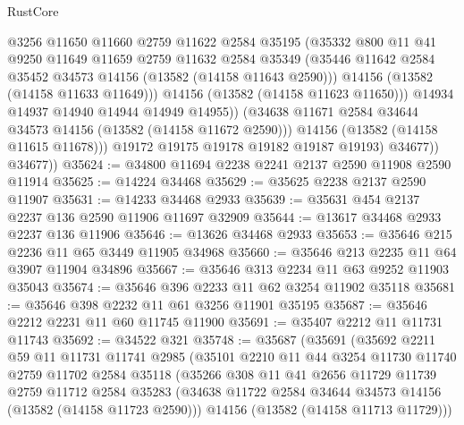 \begin{lexlean}{RustCore}
\begin{coremodule}
                      @3256
                      @11650
                      @11660
                      @2759
                      @11622
                      @2584
                      @35195
                      (@35332
                        @800
                        @11
                        @41
                        @9250
                        @11649
                        @11659
                        @2759
                        @11632
                        @2584
                        @35349
                        (@35446 @11642 @2584 @35452 @34573 @14156 (@13582 (@14158 @11643 @2590)))
                        @14156
                        (@13582 (@14158 @11633 @11649)))
                      @14156
                      (@13582 (@14158 @11623 @11650)))
                    @14934
                    @14937
                    @14940
                    @14944
                    @14949
                    @14955))
                (@34638 @11671 @2584 @34644 @34573 @14156 (@13582 (@14158 @11672 @2590)))
                @14156
                (@13582 (@14158 @11615 @11678)))
              @19172
              @19175
              @19178
              @19182
              @19187
              @19193)
            @34677))
        @34677))
@35624 := @34800 @11694 @2238 @2241 @2137 @2590 @11908 @2590 @11914
@35625 := @14224 @34468
@35629 := @35625 @2238 @2137 @2590 @11907
@35631 := @14233 @34468 @2933
@35639 := @35631 @454 @2137 @2237 @136 @2590 @11906 @11697 @32909
@35644 := @13617 @34468 @2933 @2237 @136 @11906
@35646 := @13626 @34468 @2933
@35653 := @35646 @215 @2236 @11 @65 @3449 @11905 @34968
@35660 := @35646 @213 @2235 @11 @64 @3907 @11904 @34896
@35667 := @35646 @313 @2234 @11 @63 @9252 @11903 @35043
@35674 := @35646 @396 @2233 @11 @62 @3254 @11902 @35118
@35681 := @35646 @398 @2232 @11 @61 @3256 @11901 @35195
@35687 := @35646 @2212 @2231 @11 @60 @11745 @11900
@35691 := @35407 @2212 @11 @11731 @11743
@35692 := @34522 @321
@35748 := @35687
    (@35691
      (@35692
        @2211
        @59
        @11
        @11731
        @11741
        @2985
        (@35101
          @2210
          @11
          @44
          @3254
          @11730
          @11740
          @2759
          @11702
          @2584
          @35118
          (@35266
            @308
            @11
            @41
            @2656
            @11729
            @11739
            @2759
            @11712
            @2584
            @35283
            (@34638 @11722 @2584 @34644 @34573 @14156 (@13582 (@14158 @11723 @2590)))
            @14156
            (@13582 (@14158 @11713 @11729)))

\end{coremodule}
\end{lexlean}
